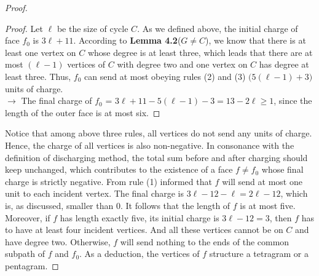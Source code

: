 \begin{proof}
\begin{proof}
Let $\ell$ be the size of cycle $C$. As we defined above, the initial charge of face $f_0$ is $3 \ell + 11$. According to \textbf{Lemma 4.2}($G \ne C$), we know that there is at least one vertex on $C$ whose degree is at least three, which leads that there are at most $(\ell - 1)$ vertices of $C$ with degree two and one vertex on $C$ has degree at least three. Thus, $f_0$ can send at most obeying rules (2) and (3) $\big(5(\ell - 1) + 3\big)$ units of charge.\\
$\longrightarrow$ The final charge of $f_0$ = $3\ell + 11 - 5(\ell - 1) - 3 = 13 - 2\ell \geq 1$, since the length of the outer face is at most six.
\end{proof}
Notice that among above three rules, all vertices do not send any units of charge. Hence, the charge of all vertices is also non-negative. In consonance with the definition of discharging method, the total sum before and after charging should keep unchanged, which contributes to the existence of a face $f \ne f_0$ whose final charge is strictly negative. From rule (1) informed that $f$ will send at most one unit to each incident vertex. The final charge is $3\ell - 12 - \ell = 2\ell - 12$, which is, as discussed, smaller than 0. It follows that the length of $f$ is at most five. Moreover, if $f$ has length exactly five, its initial charge is $3\ell - 12 = 3$, then $f$ has to have at least four incident vertices. And all these vertices cannot be on $C$ and have degree two. Otherwise, $f$ will send nothing to the ends of the common subpath of $f$ and $f_0$. As a deduction, the vertices of $f$ structure a tetragram or a pentagram.
\end{proof}

